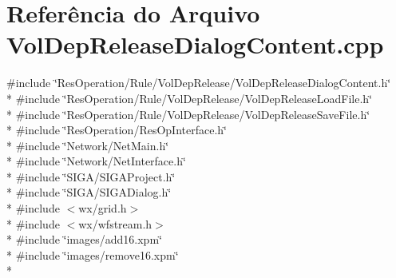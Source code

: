 \section{Referência do Arquivo Vol\+Dep\+Release\+Dialog\+Content.\+cpp}
\label{_rule_2_vol_dep_release_2_vol_dep_release_dialog_content_8cpp}
{\ttfamily \#include \char`\"{}Res\+Operation/\+Rule/\+Vol\+Dep\+Release/\+Vol\+Dep\+Release\+Dialog\+Content.\+h\char`\"{}}\\*
{\ttfamily \#include \char`\"{}Res\+Operation/\+Rule/\+Vol\+Dep\+Release/\+Vol\+Dep\+Release\+Load\+File.\+h\char`\"{}}\\*
{\ttfamily \#include \char`\"{}Res\+Operation/\+Rule/\+Vol\+Dep\+Release/\+Vol\+Dep\+Release\+Save\+File.\+h\char`\"{}}\\*
{\ttfamily \#include \char`\"{}Res\+Operation/\+Res\+Op\+Interface.\+h\char`\"{}}\\*
{\ttfamily \#include \char`\"{}Network/\+Net\+Main.\+h\char`\"{}}\\*
{\ttfamily \#include \char`\"{}Network/\+Net\+Interface.\+h\char`\"{}}\\*
{\ttfamily \#include \char`\"{}S\+I\+G\+A/\+S\+I\+G\+A\+Project.\+h\char`\"{}}\\*
{\ttfamily \#include \char`\"{}S\+I\+G\+A/\+S\+I\+G\+A\+Dialog.\+h\char`\"{}}\\*
{\ttfamily \#include $<$wx/grid.\+h$>$}\\*
{\ttfamily \#include $<$wx/wfstream.\+h$>$}\\*
{\ttfamily \#include \char`\"{}images/add16.\+xpm\char`\"{}}\\*
{\ttfamily \#include \char`\"{}images/remove16.\+xpm\char`\"{}}\\*
